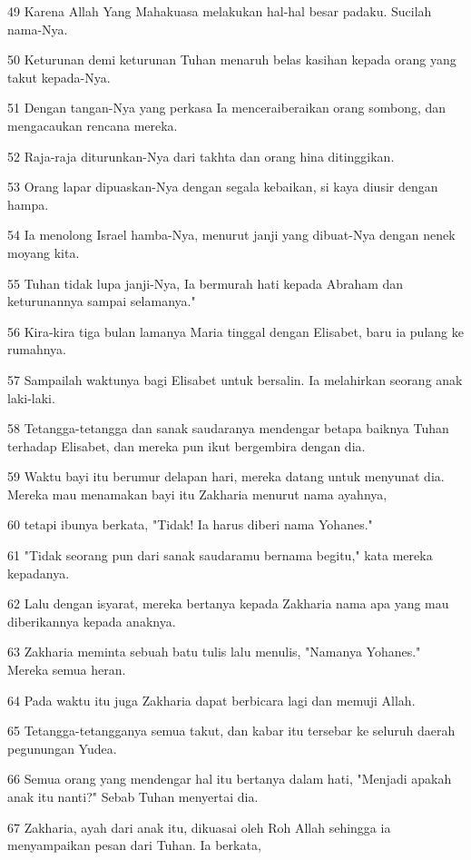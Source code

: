 \par 49 Karena Allah Yang Mahakuasa melakukan hal-hal besar padaku. Sucilah nama-Nya.
\par 50 Keturunan demi keturunan Tuhan menaruh belas kasihan kepada orang yang takut kepada-Nya.
\par 51 Dengan tangan-Nya yang perkasa Ia menceraiberaikan orang sombong, dan mengacaukan rencana mereka.
\par 52 Raja-raja diturunkan-Nya dari takhta dan orang hina ditinggikan.
\par 53 Orang lapar dipuaskan-Nya dengan segala kebaikan, si kaya diusir dengan hampa.
\par 54 Ia menolong Israel hamba-Nya, menurut janji yang dibuat-Nya dengan nenek moyang kita.
\par 55 Tuhan tidak lupa janji-Nya, Ia bermurah hati kepada Abraham dan keturunannya sampai selamanya."
\par 56 Kira-kira tiga bulan lamanya Maria tinggal dengan Elisabet, baru ia pulang ke rumahnya.
\par 57 Sampailah waktunya bagi Elisabet untuk bersalin. Ia melahirkan seorang anak laki-laki.
\par 58 Tetangga-tetangga dan sanak saudaranya mendengar betapa baiknya Tuhan terhadap Elisabet, dan mereka pun ikut bergembira dengan dia.
\par 59 Waktu bayi itu berumur delapan hari, mereka datang untuk menyunat dia. Mereka mau menamakan bayi itu Zakharia menurut nama ayahnya,
\par 60 tetapi ibunya berkata, "Tidak! Ia harus diberi nama Yohanes."
\par 61 "Tidak seorang pun dari sanak saudaramu bernama begitu," kata mereka kepadanya.
\par 62 Lalu dengan isyarat, mereka bertanya kepada Zakharia nama apa yang mau diberikannya kepada anaknya.
\par 63 Zakharia meminta sebuah batu tulis lalu menulis, "Namanya Yohanes." Mereka semua heran.
\par 64 Pada waktu itu juga Zakharia dapat berbicara lagi dan memuji Allah.
\par 65 Tetangga-tetangganya semua takut, dan kabar itu tersebar ke seluruh daerah pegunungan Yudea.
\par 66 Semua orang yang mendengar hal itu bertanya dalam hati, "Menjadi apakah anak itu nanti?" Sebab Tuhan menyertai dia.
\par 67 Zakharia, ayah dari anak itu, dikuasai oleh Roh Allah sehingga ia menyampaikan pesan dari Tuhan. Ia berkata,
